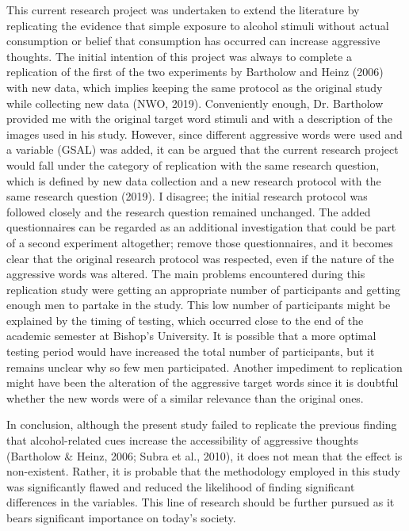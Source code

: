 \documentclass[authordate, serif, review]{jote-article}
\begin{document}
\begin{multicols}{2}
\noindent This current research project was undertaken to extend the literature by replicating the evidence that simple exposure to alcohol stimuli without actual consumption or belief that consumption has occurred can increase aggressive thoughts. The initial intention of this project was always to complete a replication of the first of the two experiments by Bartholow and Heinz (2006) with new data, which implies keeping the same protocol as the original study while collecting new data (NWO, 2019). Conveniently enough, Dr. Bartholow provided me with the original target word stimuli and with a description of the images used in his study. However, since different aggressive words were used and a variable (GSAL) was added, it can be argued that the current research project would fall under the category of replication with the same research question, which is defined by new data collection and a new research protocol with the same research question (2019). I disagree; the initial research protocol was followed closely and the research question remained unchanged. The added questionnaires can be regarded as an additional investigation that could be part of a second experiment altogether; remove those questionnaires, and it becomes clear that the original research protocol was respected, even if the nature of the aggressive words was altered. The main problems encountered during this replication study were getting an appropriate number of participants and getting enough men to partake in the study. This low number of participants might be explained by the timing of testing, which occurred close to the end of the academic semester at Bishop's University. It is possible that a more optimal testing period would have increased the total number of participants, but it remains unclear why so few men participated. Another impediment to replication might have been the alteration of the aggressive target words since it is doubtful whether the new words were of a similar relevance than the original ones. 

In conclusion, although the present study failed to replicate the previous finding that alcohol-related cues increase the accessibility of aggressive thoughts (Bartholow \& Heinz, 2006; Subra et al., 2010), it does not mean that the effect is non-existent. Rather, it is probable that the methodology employed in this study was significantly flawed and reduced the likelihood of finding significant differences in the variables. This line of research should be further pursued as it bears significant importance on today's society.  


\end{multicols}
\end{document}
